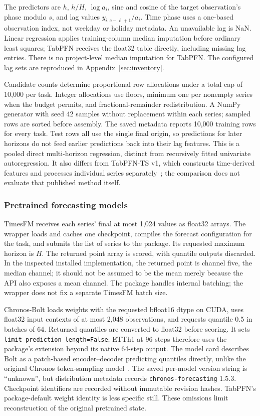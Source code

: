 The predictors are $h$, $h/H$, $\log a_i$, sine and cosine of the target observation's phase modulo $s$, and lag values $y_{i,c-\ell+1}/a_i$. Time phase uses a one-based observation index, not weekday or holiday metadata. An unavailable lag is NaN. Linear regression applies training-column median imputation before ordinary least squares; TabPFN receives the float32 table directly, including missing lag entries. There is no project-level median imputation for TabPFN. The configured lag sets are reproduced in Appendix~\ref{sec:inventory}.

Candidate counts determine proportional row allocations under a total cap of 10,000 per task. Integer allocations use floors, minimum one per nonempty series when the budget permits, and fractional-remainder redistribution. A NumPy generator with seed 42 samples without replacement within each series; sampled rows are sorted before assembly. The saved metadata reports 10,000 training rows for every task. Test rows all use the single final origin, so predictions for later horizons do not feed earlier predictions back into their lag features. This is a pooled direct multi-horizon regression, distinct from recursively fitted univariate autoregression. It also differs from TabPFN-TS v1, which constructs time-derived features and processes individual series separately~\cite{tabpfn_ts}; the comparison does not evaluate that published method itself.

\subsubsection{Pretrained forecasting models}
TimesFM receives each series' final at most 1,024 values as float32 arrays. The wrapper loads and caches one checkpoint, compiles the forecast configuration for the task, and submits the list of series to the package. Its requested maximum horizon is $H$. The returned point array is scored, with quantile outputs discarded. In the inspected installed implementation, the returned point is channel five, the median channel; it should not be assumed to be the mean merely because the API also exposes a mean channel. The package handles internal batching; the wrapper does not fix a separate TimesFM batch size.

Chronos-Bolt loads weights with the requested bfloat16 dtype on CUDA, uses float32 input contexts of at most 2,048 observations, and requests quantile 0.5 in batches of 64. Returned quantiles are converted to float32 before scoring. It sets \texttt{limit\_prediction\_length=False}; ETTh1 at 96 steps therefore uses the package's extension beyond its native 64-step output. The model card describes Bolt as a patch-based encoder--decoder predicting quantiles directly, unlike the original Chronos token-sampling model~\cite{chronos_bolt_card}. The saved per-model version string is ``unknown'', but distribution metadata records \texttt{chronos-forecasting} 1.5.3. Checkpoint identifiers are recorded without immutable revision hashes. TabPFN's package-default weight identity is less specific still. These omissions limit reconstruction of the original pretrained state.


